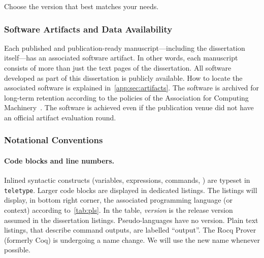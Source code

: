 Choose the version that best matches your needs.

\subsubsection{Software Artifacts and Data Availability}

Each published and publication-ready manuscript---including the dissertation itself---has an associated software artifact.
In other words, each manuscript consists of more than just the text pages of the dissertation.
All software developed as part of this dissertation is publicly available.
How to locate the associated software is explained in~\autoref{app:sec:artifacts}.
The software is archived for long-term retention according to the policies of the Association for Computing Machinery~\cite{acm_badging}.
The software is achieved even if the publication venue did not have an official artifact evaluation round.

\subsubsection{Notational Conventions}

\paragraph*{Code blocks and line numbers.}
Inlined syntactic constructs (variables, expressions, commands, \etc) are typeset in \texttt{teletype}.
Larger code blocks are displayed in dedicated listings.
The listings will display, in bottom right corner, the associated programming language (or context) according to~\autoref{tab:pls}.
In the table, \emph{version} is the release version assumed in the dissertation listings.
Pseudo-languages have no version.
Plain text listings, that describe command outputs, are labelled \enquote{output}.
The Rocq Prover (formerly Coq) is undergoing a name change.
We will use the new name whenever possible.


